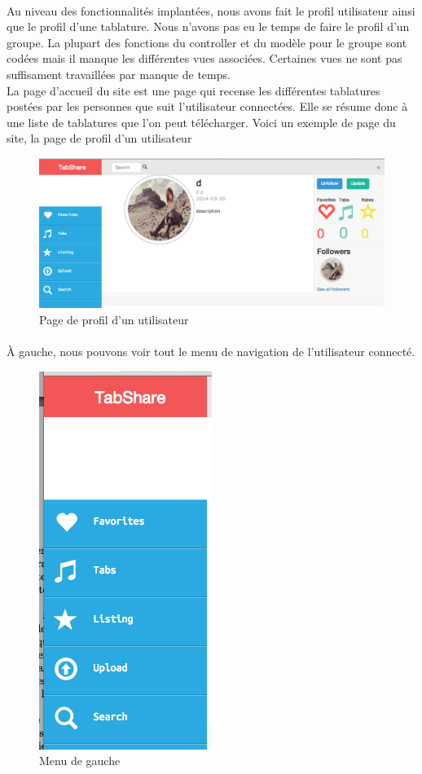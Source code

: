 \paragraph{}
Au niveau des fonctionnalités implantées, nous avons fait le profil utilisateur ainsi que le profil d'une tablature. Nous n'avons pas eu le temps de faire le profil d'un groupe. La plupart des fonctions du controller et du modèle pour le groupe sont codées mais il manque les différentes vues associées. Certaines vues ne sont pas suffisament travaillées par manque de temps. \\
La page d'accueil du site est une page qui recense les différentes tablatures postées par les personnes que suit l'utilisateur connectées.
Elle se résume donc à une liste de tablatures que l'on peut télécharger.
Voici un exemple de page du site, la page de profil d'un utilisateur

\begin{figure}[H]
\centering
\includegraphics[scale=0.3]{profilUserWeb}
\caption{Page de profil d'un utilisateur}
\end{figure}

\paragraph{}
À gauche, nous pouvons voir tout le menu de navigation de l'utilisateur connecté.

\begin{figure}[H]
\centering
\includegraphics[scale=0.5]{leftWEB}
\caption{Menu de gauche}
\end{figure}

